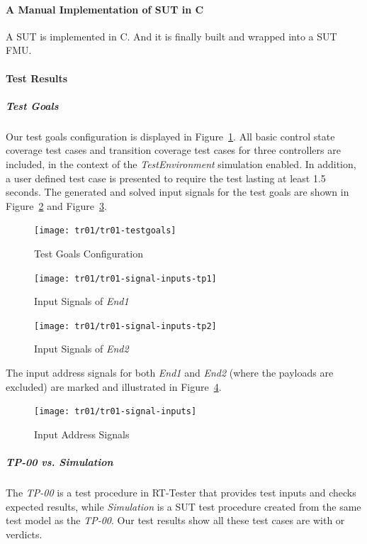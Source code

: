 \paragraph{A Manual Implementation of SUT in C}
A SUT is implemented in C. And it is finally built and wrapped into a SUT FMU.

\paragraph{Test Results}

\subparagraph{Test Goals}
Our test goals configuration is displayed in Figure~\ref{fig:ether-ta-tr01-testgoal}. All basic control state coverage test cases and transition coverage test cases for three controllers are included, in the context of the \emph{TestEnvironment} simulation enabled. In addition, a user defined test case is presented to require the test lasting at least 1.5 seconds. The generated and solved input signals for the test goals are shown in Figure~\ref{fig:ether-ta-tr01-signal-inputs-tp1} and Figure~\ref{fig:ether-ta-tr01-signal-inputs-tp2}.

\begin{figure}[htb!]
	\centering
	\texttt{[image: tr01/tr01-testgoals]}
	\caption{Test Goals Configuration}
	\label{fig:ether-ta-tr01-testgoal}
\end{figure}

\begin{figure}[htb!]
    \centering
	\texttt{[image: tr01/tr01-signal-inputs-tp1]}
    \caption{Input Signals of \emph{End1}}
    \label{fig:ether-ta-tr01-signal-inputs-tp1}
\end{figure}

\begin{figure}[htb!]
    \centering
	\texttt{[image: tr01/tr01-signal-inputs-tp2]}
    \caption{Input Signals of \emph{End2}}
    \label{fig:ether-ta-tr01-signal-inputs-tp2}
\end{figure}

The input address signals for both \emph{End1} and \emph{End2} (where the payloads are excluded) are marked and illustrated in Figure~\ref{fig:ether-ta-tr01-signal-inputs}.

\begin{figure}[htb!]
    \centering
	\texttt{[image: tr01/tr01-signal-inputs]}
    \caption{Input Address Signals}
    \label{fig:ether-ta-tr01-signal-inputs}
\end{figure}

\subparagraph{\emph{TP-00} vs. \emph{Simulation}}
The \emph{TP-00} is a test procedure in RT-Tester that provides test inputs and checks expected results, while \emph{Simulation} is a SUT test procedure created from the same test model as the \emph{TP-00}. Our test results show all these test cases are with  or  verdicts. 

